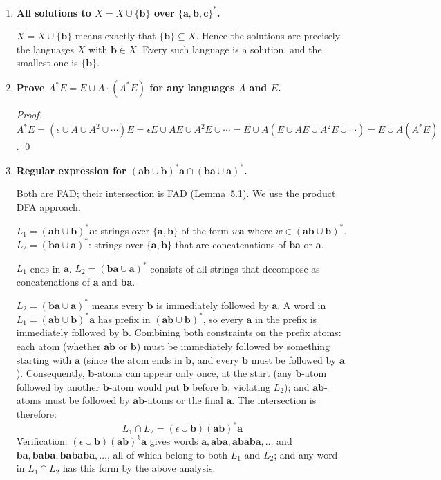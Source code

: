 \begin{enumerate}[{6.}1.]
\item \textbf{All solutions to $X=X\cup\{\pmb{b}\}$ over $\{\pmb{a},\pmb{b},\pmb{c}\}^*$.}

$X=X\cup\{\pmb{b}\}$ means exactly that $\{\pmb{b}\}\subseteq X$.  Hence the
solutions are precisely the languages $X$ with $\pmb{b}\in X$.  Every such
language is a solution, and the smallest one is $\{\pmb{b}\}$.

\item \textbf{Prove $A^*E=E\cup A\cdot(A^*E)$ for any languages $A$ and $E$.}

\begin{proof}
$A^*E=(\epsilon\cup A\cup A^2\cup\cdots)E=\epsilon E\cup AE\cup A^2E\cup\cdots=E\cup A(E\cup AE\cup A^2E\cup\cdots)=E\cup A(A^*E)$. \qed
\end{proof}

\item \textbf{Regular expression for $(\pmb{ab}\cup\pmb{b})^*\pmb{a}\cap(\pmb{ba}\cup\pmb{a})^*$.}

Both are FAD; their intersection is FAD (Lemma~5.1).  We use the product DFA approach.

$L_1=(\pmb{ab}\cup\pmb{b})^*\pmb{a}$: strings over $\{\pmb{a},\pmb{b}\}$ of the form $w\pmb{a}$ where $w\in(\pmb{ab}\cup\pmb{b})^*$.
$L_2=(\pmb{ba}\cup\pmb{a})^*$: strings over $\{\pmb{a},\pmb{b}\}$ that are concatenations of $\pmb{ba}$ or $\pmb{a}$.

$L_1$ ends in $\pmb{a}$.  $L_2=(\pmb{ba}\cup\pmb{a})^*$ consists of all strings that decompose as concatenations of $\pmb{a}$ and $\pmb{ba}$.

$L_2=(\pmb{ba}\cup\pmb{a})^*$ means every $\pmb{b}$ is immediately followed by $\pmb{a}$.  A word in $L_1=(\pmb{ab}\cup\pmb{b})^*\pmb{a}$ has prefix in $(\pmb{ab}\cup\pmb{b})^*$, so every $\pmb{a}$ in the prefix is immediately followed by $\pmb{b}$.  Combining both constraints on the prefix atoms: each atom (whether $\pmb{ab}$ or $\pmb{b}$) must be immediately followed by something starting with $\pmb{a}$ (since the atom ends in $\pmb{b}$, and every $\pmb{b}$ must be followed by $\pmb{a}$).  Consequently, $\pmb{b}$-atoms can appear only once, at the start (any $\pmb{b}$-atom followed by another $\pmb{b}$-atom would put $\pmb{b}$ before $\pmb{b}$, violating $L_2$); and $\pmb{ab}$-atoms must be followed by $\pmb{ab}$-atoms or the final $\pmb{a}$.  The intersection is therefore:
\[
  L_1\cap L_2 = (\epsilon\cup\pmb{b})(\pmb{ab})^*\pmb{a}
\]
Verification: $(\epsilon\cup\pmb{b})(\pmb{ab})^k\pmb{a}$ gives words $\pmb{a}, \pmb{aba}, \pmb{ababa},\ldots$ and $\pmb{ba}, \pmb{baba}, \pmb{bababa},\ldots$, all of which belong to both $L_1$ and $L_2$; and any word in $L_1\cap L_2$ has this form by the above analysis.


\end{enumerate}
